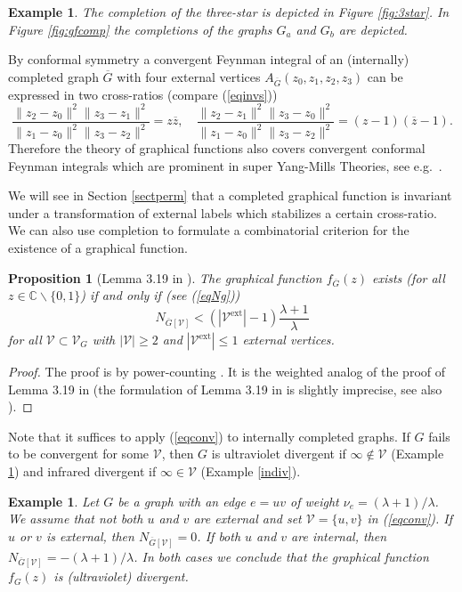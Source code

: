 \documentclass[oneside]{amsart}
\newcommand{\CC}{{\mathbb C}}
\newcommand{\zz}{{\overline{z}}}
\newcommand{\Gg}{{\overline{G}}}
\newcommand{\sV}{\mathcal{V}}
\theoremstyle{plain}
\newtheorem{prop}[thm]{Proposition}
\newtheorem{ex}[thm]{Example}
\begin{document}
\begin{ex}
The completion of the three-star is depicted in Figure \ref{fig:3star}.
In Figure \ref{fig:gfcomp} the completions of the graphs $G_a$ and $G_b$ are depicted.
\end{ex}

By conformal symmetry a convergent Feynman integral of an (internally) completed graph $\Gg$ with four external vertices $A_\Gg(z_0,z_1,z_2,z_3)$ can be expressed in two
cross-ratios (compare (\ref{eqinvs}))
\begin{equation}\label{eqinvsconf}
\frac{\|z_2-z_0\|^2\|z_3-z_1\|^2}{\|z_1-z_0\|^2\|z_3-z_2\|^2}=z\zz,\quad\frac{\|z_2-z_1\|^2\|z_3-z_0\|^2}{\|z_1-z_0\|^2\|z_3-z_2\|^2}=(z-1)(\zz-1).
\end{equation}
Therefore the theory of graphical functions also covers convergent conformal Feynman integrals which are prominent in super Yang-Mills Theories, see e.g.\ \cite{SYM}.

We will see in Section \ref{sectperm} that a completed graphical function is invariant under a transformation of external labels which stabilizes a certain cross-ratio.
We can also use completion to formulate a combinatorial criterion for the existence of a graphical function.

\begin{prop}[Lemma 3.19 in \cite{gf}]\label{propconv}
The graphical function $f_\Gg(z)$ exists (for all $z\in\CC\backslash\{0,1\}$) if and only if (see (\ref{eqNg}))
\begin{equation}\label{eqconv}
N_{\Gg[\sV]}<(|\sV^{\mathrm{ext}}|-1)\frac{\lambda+1}{\lambda}
\end{equation}
for all $\sV\subset\sV_G$  with $|\sV|\geq2$ and $|\sV^{\mathrm{ext}}|\leq1$ external vertices.
\end{prop}
\begin{proof}
The proof is by power-counting \cite{powercount}. It is the weighted analog of the proof of Lemma 3.19 in \cite{gf} (the formulation of Lemma 3.19 in \cite{gf} is slightly imprecise,
see also \cite{par}).
\end{proof}
Note that it suffices to apply (\ref{eqconv}) to internally completed graphs. If $G$ fails to be convergent for some $\sV$, then $G$ is ultraviolet divergent if $\infty\notin\sV$
(Example \ref{uvdiv}) and infrared divergent if $\infty\in\sV$ (Example \ref{indiv}).

\begin{ex}\label{uvdiv}
Let $G$ be a graph with an edge $e=uv$ of weight $\nu_e=(\lambda+1)/\lambda$. We assume that not both $u$ and $v$ are external and set $\sV=\{u,v\}$ in (\ref{eqconv}).
If $u$ or $v$ is external, then $N_{\Gg[\sV]}=0$. If both $u$ and $v$ are internal, then $N_{\Gg[\sV]}=-(\lambda+1)/\lambda$. In both cases we conclude that the graphical
function $f_G(z)$ is (ultraviolet) divergent.
\end{ex}
\end{document}
